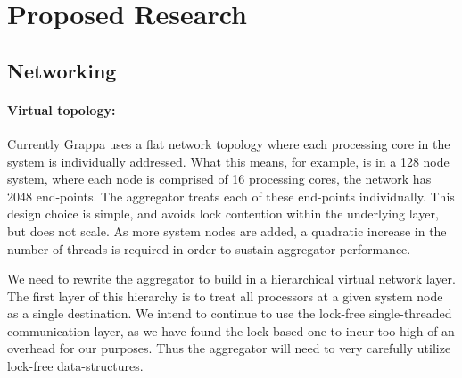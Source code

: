 \section{Proposed Research}



\subsection{Networking}




\paragraph{Virtual topology:} Currently Grappa uses a flat network topology
where each processing core in the system is individually addressed. What this
means, for example, is in a 128 node system, where each node is comprised of
16 processing cores, the network has 2048 end-points. The aggregator treats
each of these end-points individually. This design choice is simple, and
avoids lock contention within the underlying \gasnet layer, but does not
scale. As more system nodes are added, a quadratic increase in the number of
threads is required in order to sustain aggregator performance.

We need to rewrite the aggregator to build in a hierarchical virtual network layer.  The first layer of this hierarchy is to treat all processors at a given system node as a single destination. We intend to continue to use the lock-free single-threaded \gasnet communication layer, as we have found the lock-based one to incur too high of an overhead for our purposes.  Thus the aggregator will need to very carefully utilize lock-free data-structures.

